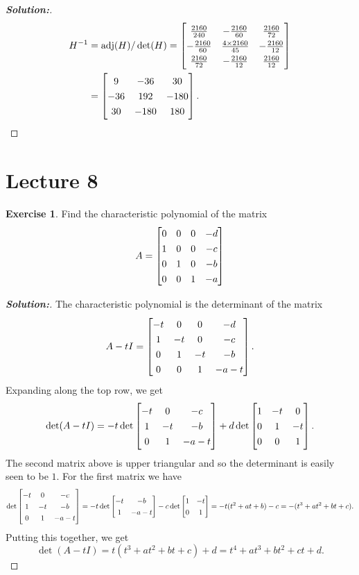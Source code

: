 \documentclass[a4paper]{amsart}
\theoremstyle{definition}
\newtheorem{exercise}{Exercise}
\newenvironment{solution}{\begin{proof}[\textbf{Solution:}] \vphantom{u}}{\end{proof}}
\begin{document}
\begin{solution}
\begin{align*}
  H^{-1} &= \adj(H)/\det(H) 
           = \renewcommand{\arraystretch}{1.3} \bbm 
                   \frac{2160}{240} & -\frac{2160}{60} & \frac{2160}{72} \\
                  -\frac{2160}{60} &  \frac{4\tm 2160}{45} & -\frac{2160}{12} \\
                   \frac{2160}{72} & -\frac{2160}{12} &
                   \frac{2160}{12} \ebm \\
         &= \bbm   9 &  -36 &   30 \\
                 -36 &  192 & -180 \\
                  30 & -180 &  180 \ebm.
 \end{align*}
\end{solution}


\section{Lecture 8}

\begin{exercise}\label{ex-char-companion}
 Find the characteristic polynomial of the matrix
 \[ A = \bbm
     0 & 0 & 0 & -d \\
     1 & 0 & 0 & -c \\
     0 & 1 & 0 & -b \\
     0 & 0 & 1 & -a
    \ebm
 \]
\end{exercise}
\begin{solution}
 The characteristic polynomial is the determinant of the matrix
 \[ A-tI = \bbm
    -t &  0 &  0 & -d \\
     1 & -t &  0 & -c \\
     0 &  1 & -t & -b \\
     0 &  0 &  1 & -a-t
    \ebm.
 \]
 Expanding along the top row, we get
 \[ \det(A-tI) = 
    -t\det\bbm -t &  0 & -c \\
                1 & -t & -b \\
                0 &  1 & -a-t \ebm 
    +d\det\bbm  1 & -t &  0 \\
                0 &  1 & -t \\
                0 &  0 &  1 \ebm. 
 \]
 The second matrix above is upper triangular and so the determinant is
 easily seen to be $1$.  For the first matrix we have
 \[ \det\bbm -t &  0 & -c \\
              1 & -t & -b \\
              0 &  1 & -a-t \ebm = 
    -t \det\bbm -t & -b \\ 1 & -a-t \ebm 
    -c \det\bbm 1 & -t \\ 0 & 1 \ebm =
    -t(t^2+at+b) - c = -(t^3+at^2+bt+c).
 \]
 Putting this together, we get 
 \[ \det(A-tI) =
     t(t^3+at^2+bt+c)+d = t^4+at^3+bt^2+ct+d.
 \]
\end{solution}
\end{document}
